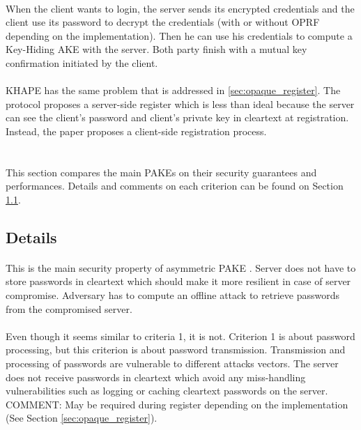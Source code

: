 ﻿\documentclass[../report.tex]{subfiles}
\begin{document}
\paragraph{}
When the client wants to login, the server sends its encrypted credentials and the client use its password to decrypt the credentials (with or without OPRF depending on the implementation). Then he can use his credentials to compute a Key-Hiding AKE with the server.
Both party finish with a mutual key confirmation initiated by the client.

\paragraph{}
KHAPE has the same problem that is addressed in \ref{sec:opaque_register}.
The protocol proposes a server-side register which is less than ideal because the server can see the client's password and client's private key in cleartext at registration.
Instead, the paper proposes a client-side registration process.


\section{}
This section compares the main PAKEs on their security guarantees and performances. Details and comments on each criterion can be found on Section \ref{sec:comparison_details}.
 
\subsection{Details} \label{sec:comparison_details}

\paragraph{}
This is the main security property of asymmetric PAKE \cite{aPAKE_Formalized}. Server does not have to store passwords in cleartext which should make it more resilient in case of server compromise. Adversary has to compute an offline attack to retrieve passwords from the compromised server.
\paragraph{}
Even though it seems similar to criteria 1, it is not. Criterion 1 is about password processing, but this criterion is about password transmission. Transmission and processing of passwords are vulnerable to different attacks vectors.
The server does not receive passwords in cleartext which avoid any miss-handling vulnerabilities such as logging or caching cleartext passwords on the server.
COMMENT: May be required during register depending on the implementation (See Section \ref{sec:opaque_register}).
\end{document}
